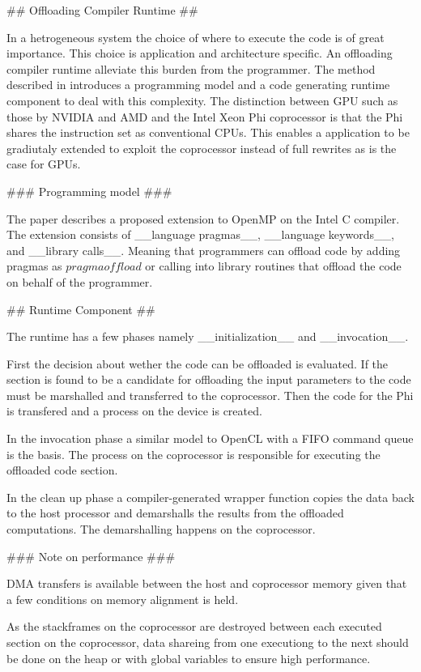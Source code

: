 \begin{markdown}

## Offloading Compiler Runtime ##

In a hetrogeneous system the choice of where to execute the code is of
great importance. This choice is application and architecture
specific. An offloading compiler runtime alleviate this burden from
the programmer. The method described in \cite{phi} introduces a
programming model and a code generating runtime component to deal with
this complexity. The distinction between GPU such as those by NVIDIA
and AMD and the Intel Xeon Phi coprocessor is that the Phi shares the
instruction set as conventional CPUs. This enables a application to be
gradiutaly extended to exploit the coprocessor instead of full
rewrites as is the case for GPUs. 

### Programming model ###

The paper describes a proposed extension to OpenMP \cite{openmp} on
the Intel C compiler. The extension consists of __language pragmas__,
__language keywords__, and __library calls__. Meaning that programmers
can offload code by adding pragmas as $pragma offload$ or calling into
library routines that offload the code on behalf of the programmer. 

## Runtime Component ##

The runtime has a few phases namely __initialization__ and
__invocation__.

First the decision about wether the code can be offloaded is
evaluated. If the section is found to be a candidate for offloading
the input parameters to the code must be marshalled and transferred to
the coprocessor. Then the code for the Phi is transfered and a process
on the device is created.

In the invocation phase a similar model to OpenCL with a FIFO command
queue is the basis. The process on the coprocessor is responsible for
executing the offloaded code section.

In the clean up phase a compiler-generated wrapper function copies the
data back to the host processor and demarshalls the results from the
offloaded computations. The demarshalling happens on the coprocessor.

### Note on performance ###

DMA transfers is available between the host and coprocessor memory
given that a few conditions on memory alignment is held.

As the stackframes on the coprocessor are destroyed between each
executed section on the coprocessor, data shareing from one executiong
to the next should be done on the heap or with global variables to
ensure high performance. 

\end{markdown}
